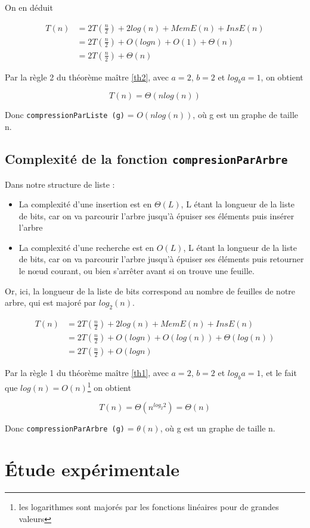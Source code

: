 \documentclass[12pt,a4paper]{article}
\begin{document}
On en déduit 

\begin{align*}
T(n) &= 2 T(\frac{n}{2}) + 2log(n) + MemE(n) + InsE(n)\\
&= 2 T(\frac{n}{2}) + O(log n) + O(1) + \Theta (n)\\
&= 2 T(\frac{n}{2}) + \Theta (n)
\end{align*}

Par la règle 2 du théorème maître  \ref{th2}, avec $a = 2$, $b = 2$ et $log_b a = 1$, on obtient 

$$
T(n) = \Theta (n log (n))
$$ 

\medskip

Donc \texttt{compressionParListe (g)} = $O(n log (n))$, où g est un graphe de taille n.


\subsection{Complexité de la fonction \texttt{compresionParArbre}}

Dans notre structure de liste : 
\begin{itemize}
\item La complexité d'une insertion est en $\Theta(L)$, L étant la longueur de la liste de bits, car on va parcourir l'arbre jusqu'à épuiser ses éléments puis insérer l'arbre
\item La complexité d'une recherche est en $O(L)$, L étant la longueur de la liste de bits, car on va parcourir l'arbre jusqu'à épuiser ses éléments puis retourner le nœud courant, ou bien s'arrêter avant si on trouve une feuille.
\end{itemize}

Or, ici, la longueur de la liste de bits correspond au nombre de feuilles de notre arbre, qui est majoré par $log_2 (n)$.

\begin{align*}
T(n) &= 2 T(\frac{n}{2}) + 2log(n) + MemE(n) + InsE(n)\\
&= 2 T(\frac{n}{2}) + O(log n) + O(log(n)) + \Theta (log(n))\\
&= 2 T(\frac{n}{2}) + O(log n)
\end{align*}

Par la règle 1 du théorème maître  \ref{th1}, avec $a = 2$, $b = 2$ et $log_b a = 1$, et le fait que $log(n) = O(n)$\footnote{les logarithmes sont majorés par les fonctions linéaires pour de grandes valeurs} on obtient 

$$
T(n) = \Theta (n ^{log_2 2}) = \Theta(n)
$$ 

\medskip

Donc \texttt{compressionParArbre (g)} = $\theta(n)$, où g est un graphe de taille n.






\section{Étude expérimentale}
\end{document}
